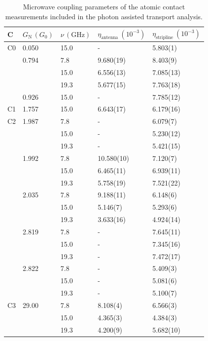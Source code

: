 \begin{table}[p]
            \caption{Microwave coupling parameters of the atomic contact measurements included in the photon assisted transport analysis.}
            \label{table:ac:coupling-parameter}
            \vspace{1em}
            \begin{tabular}{l|l|l|l|l}
                C & $G_\mathrm{N}\,(G_0)$ & $\nu\,(\unit{\giga\hertz})$ & $\eta_\mathrm{antenna}\ (10^{-3})$ & $\eta_\mathrm{stripline}\ (10^{-3})$ \\\hline
                C0 & 0.050 & 15.0 & -          &  5.803(1)  \\
                   & 0.794 &  7.8 & 9.680(19)  &  8.403(9)  \\
                   &       & 15.0 & 6.556(13)  &  7.085(13) \\
                   &       & 19.3 & 5.677(15)  &  7.763(18) \\
                   & 0.926 & 15.0 & -          &  7.785(12) \\
                C1 & 1.757 & 15.0 & 6.643(17)  &  6.179(16) \\
                C2 & 1.987 &  7.8 & -          &  6.079(7)  \\
                   &       & 15.0 & -          &  5.230(12) \\
                   &       & 19.3 & -          &  5.421(15) \\
                   & 1.992 &  7.8 & 10.580(10) &  7.120(7)  \\
                   &       & 15.0 &  6.465(11) &  6.939(11) \\
                   &       & 19.3 &  5.758(19) &  7.521(22) \\
                   & 2.035 &  7.8 &  9.188(11) &  6.148(6)  \\
                   &       & 15.0 &  5.146(7)  &  5.293(6)  \\
                   &       & 19.3 &  3.633(16) &  4.924(14) \\
                   & 2.819 &  7.8 & -          &  7.645(11) \\
                   &       & 15.0 & -          &  7.345(16) \\
                   &       & 19.3 & -          &  7.472(17) \\
                   & 2.822 &  7.8 & -          &  5.409(3)  \\
                   &       & 15.0 & -          &  5.081(6)  \\
                   &       & 19.3 & -          &  5.100(7)  \\
                C3 & 29.00 &  7.8 & 8.108(4)   &  6.566(3)  \\
                   &       & 15.0 & 4.365(3)   &  4.384(3)  \\
                   &       & 19.3 & 4.200(9)   &  5.682(10)
            \end{tabular}
        \end{table}

